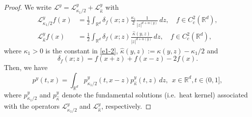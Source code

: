 \documentclass[a4paper,11pt]{amsart}
\newcommand{\R}{\mathds R}
\newcommand{\K}{\kappa}
\newcommand{\A}{\alpha}
\def\LL{{\mathcal L}}
\def\wh{\widehat}
\theoremstyle{definition}
\begin{document}
\begin{proof}
We write  $ \LL^y=\LL_{{\K_1}/{2}}^y+\LL_{\wh \K}^y$ with
\begin{align*}
\LL_{{\K_1}/{2}}^y f(x)&=\frac{1}{2}\int_{\R^d}\delta_{f}(x;z)\frac{\K_1}{2}\frac{1}{|z|^{d+\A(y)}}\,dz,\quad f\in C_c^2(\R^d),\\
\LL_{\wh \K}^y f(x)&=\frac{1}{2}\int_{\R^d}\delta_{f}(x;z)\frac{\wh \K(y,z)}{|z|^{d+\A(y)}}\,dz,\quad f\in C_c^2(\R^d),
\end{align*}
where $\K_1>0$ is the constant in \eqref{e1-2}, $\wh \K(y,z):=\K(y,z)-\K_1/2$ and
$$\delta_f(x;z)=f(x+z)+f(x-z)-2f(x).$$ Then, we have
\begin{equation}\label{l4-4-2}
p^y(t,x)=\int_{\R^d}p^y_{{\K_1}/{2}}(t,x-z)p^y_{\wh \K}(t,z)\,dz,\ \ x\in \R^d, t\in (0,1],
\end{equation}
where $p^y_{{\K_1}/{2}}$ and $p^y_{\wh \K}$ denote the fundamental solutions (i.e.\ heat kernel) associated with
the operators $\LL_{{\K_1}/{2}}^y$ and $\LL_{\wh \K}^y$, respectively.


\end{proof}
\end{document}
